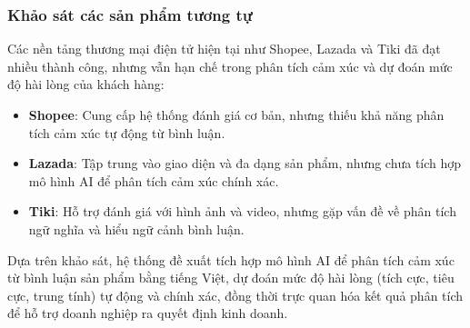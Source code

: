 \subsubsection{Khảo sát các sản phẩm tương tự}
Các nền tảng thương mại điện tử hiện tại như Shopee, Lazada và Tiki đã đạt nhiều thành công, nhưng vẫn hạn chế trong phân tích cảm xúc và dự đoán mức độ hài lòng của khách hàng:
\begin{itemize}
    \item \textbf{Shopee}: Cung cấp hệ thống đánh giá cơ bản, nhưng thiếu khả năng phân tích cảm xúc tự động từ bình luận.
    \item \textbf{Lazada}: Tập trung vào giao diện và đa dạng sản phẩm, nhưng chưa tích hợp mô hình AI để phân tích cảm xúc chính xác.
    \item \textbf{Tiki}: Hỗ trợ đánh giá với hình ảnh và video, nhưng gặp vấn đề về phân tích ngữ nghĩa và hiểu ngữ cảnh bình luận.
\end{itemize}

Dựa trên khảo sát, hệ thống đề xuất tích hợp mô hình AI để phân tích cảm xúc từ bình luận sản phẩm bằng tiếng Việt, dự đoán mức độ hài lòng (tích cực, tiêu cực, trung tính) tự động và chính xác, đồng thời trực quan hóa kết quả phân tích để hỗ trợ doanh nghiệp ra quyết định kinh doanh.


